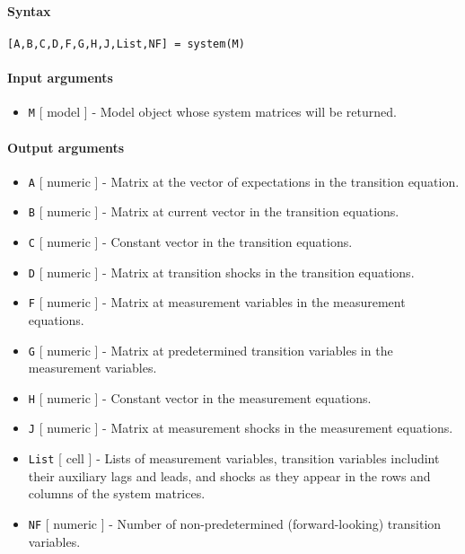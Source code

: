 


	\paragraph{Syntax}\label{syntax}

\begin{verbatim}
[A,B,C,D,F,G,H,J,List,NF] = system(M)
\end{verbatim}

\paragraph{Input arguments}\label{input-arguments}

\begin{itemize}
\itemsep1pt\parskip0pt
\item
  \texttt{M} {[} model {]} - Model object whose system matrices will be
  returned.
\end{itemize}

\paragraph{Output arguments}\label{output-arguments}

\begin{itemize}
\item
  \texttt{A} {[} numeric {]} - Matrix at the vector of expectations in
  the transition equation.
\item
  \texttt{B} {[} numeric {]} - Matrix at current vector in the
  transition equations.
\item
  \texttt{C} {[} numeric {]} - Constant vector in the transition
  equations.
\item
  \texttt{D} {[} numeric {]} - Matrix at transition shocks in the
  transition equations.
\item
  \texttt{F} {[} numeric {]} - Matrix at measurement variables in the
  measurement equations.
\item
  \texttt{G} {[} numeric {]} - Matrix at predetermined transition
  variables in the measurement variables.
\item
  \texttt{H} {[} numeric {]} - Constant vector in the measurement
  equations.
\item
  \texttt{J} {[} numeric {]} - Matrix at measurement shocks in the
  measurement equations.
\item
  \texttt{List} {[} cell {]} - Lists of measurement variables,
  transition variables includint their auxiliary lags and leads, and
  shocks as they appear in the rows and columns of the system matrices.
\item
  \texttt{NF} {[} numeric {]} - Number of non-predetermined
  (forward-looking) transition variables.
\end{itemize}

